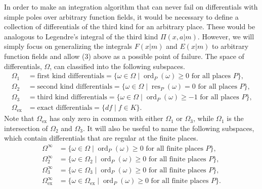 \documentclass[12pt,reqno]{amsart}
\numberwithin{equation}{section}
\newcommand{\op}[1]  { \operatorname{ #1 }}
\begin{document}
In order to make an integration algorithm that can never fail on differentials with simple poles over arbitrary function fields, it would be necessary to define a collection of differentials of the third kind for an arbitrary place. These would be analogous to Legendre's integral of the third kind $\Pi(x,a|m)$. However, we will simply focus on generalizing the integrals $F(x|m)$ and $E(x|m)$ to arbitrary function fields and allow (3) above as a possible point of failure. The space of differentials, $\Omega$, can classified into the following subspaces.
\begin{align*}
\Omega_1 &=  \text{first kind differentials} = \{ \omega \in \Omega \mid \op{ord}_P(\omega) \ge 0 \text{ for all places } P  \}\text{,}\\
\Omega_2 &= \text{second kind differentials} = \{ \omega \in \Omega \mid \op{res}_P(\omega) = 0 \text{ for all places } P  \}\text{,}\\
\Omega_3 &= \text{third kind differentials} = \{ \omega \in \Omega \mid \op{ord}_P(\omega) \ge -1 \text{ for all places } P  \}\text{,}\\
\Omega_{\op{ex}} &= \text{exact differentials} = \{ d f \mid f \in K  \}\text{.}
\end{align*}
Note that $\Omega_{\op{ex}}$ has only zero in common with either $\Omega_1$ or $\Omega_3$, while $\Omega_1$ is the intersection of $\Omega_2$ and $\Omega_3$. It will also be useful to name the following subspaces, which contain differentials that are regular at the finite places.
\begin{align*}
\Omega^{\infty} &=  \{ \omega \in \Omega \mid \op{ord}_P(\omega) \ge 0 \text{ for all finite places } P  \}\text{,}\\
\Omega_2^{\infty} &=  \{ \omega \in \Omega_2 \mid \op{ord}_P(\omega) \ge 0 \text{ for all finite places } P  \}\text{,}\\
\Omega_3^{\infty} &=  \{ \omega \in \Omega_3 \mid \op{ord}_P(\omega) \ge 0 \text{ for all finite places } P  \}\text{,}\\
\Omega_{\op{ex}}^{\infty} &= \{ \omega \in \Omega_{\op{ex}} \mid \op{ord}_P(\omega) \ge 0 \text{ for all finite places } P  \}\text{.}\\
\end{align*}
\end{document}
